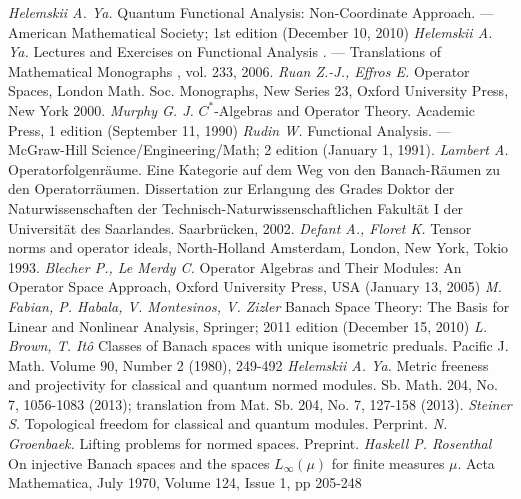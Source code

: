\documentclass[12pt]{article}
\begin{document}
\newpage
\begin{thebibliography}{999}
\textit{Helemskii A. Ya.} Quantum Functional Analysis: Non-Coordinate Approach. — American Mathematical Society; 1st edition (December 10, 2010)
\textit{Helemskii A. Ya.} Lectures and Exercises on Functional Analysis  . — Translations of Mathematical Monographs , vol. 233, 2006.
\textit{Ruan Z.-J., Effros E.} Operator Spaces, London Math. Soc. Monographs, New Series 23, Oxford University Press, New York 2000.
\textit{Murphy G. J.} $C^*$-Algebras and Operator Theory. Academic Press, 1 edition (September 11, 1990)
\textit{Rudin W.} Functional Analysis. — McGraw-Hill Science/Engineering/Math; 2 edition (January 1, 1991).
\textit{Lambert A.} Operatorfolgenr\"{a}ume. Eine Kategorie auf dem Weg von den Banach-R\"{a}umen zu den Operatorr\"{a}umen. Dissertation zur Erlangung des Grades Doktor der Naturwissenschaften der Technisch-Naturwissenschaftlichen Fakult\"{a}t I der Universit\"{a}t des Saarlandes. Saarbr\"{u}cken, 2002.
\textit{Defant A., Floret K.} Tensor norms and operator ideals, North-Holland Amsterdam,
London, New York, Tokio 1993.
\textit{Blecher P., Le Merdy C.} Operator Algebras and Their Modules: An Operator Space Approach, Oxford University Press, USA (January 13, 2005)
\textit{M. Fabian, P. Habala, V. Montesinos, V. Zizler} Banach Space Theory: The Basis for Linear and Nonlinear Analysis, Springer; 2011 edition (December 15, 2010)
\textit{L. Brown, T. Itô} Classes of Banach spaces with unique isometric preduals. Pacific J. Math. Volume 90, Number 2 (1980), 249-492
\textit{Helemskii A. Ya.} Metric freeness and projectivity for classical and quantum normed modules. Sb. Math. 204, No. 7, 1056-1083 (2013); translation from Mat. Sb. 204, No. 7, 127-158 (2013).
\textit{Steiner S.} Topological freedom for classical and quantum modules. Perprint.
\textit{N. Groenbaek.} Lifting problems for normed spaces. Preprint.
\textit{Haskell P. Rosenthal} On injective Banach spaces and the spaces $L_\infty(\mu)$ for finite measures $\mu$. Acta Mathematica, July 1970, Volume 124, Issue 1, pp 205-248
\end{thebibliography}
\end{document}
